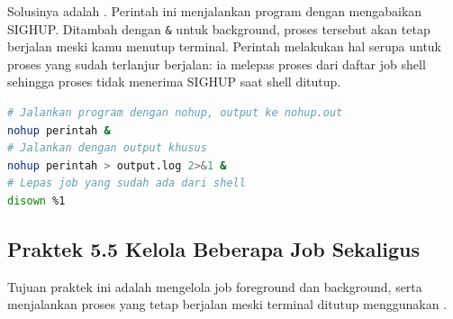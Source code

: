 Solusinya adalah . Perintah ini menjalankan program dengan mengabaikan
SIGHUP. Ditambah dengan \texttt{\&} untuk background, proses tersebut akan tetap berjalan
meski kamu menutup terminal. Perintah  melakukan hal serupa untuk proses yang
sudah terlanjur berjalan: ia melepas proses dari daftar job shell sehingga proses tidak
menerima SIGHUP saat shell ditutup.

\begin{lstlisting}[language=bash, caption={Menjalankan proses tahan logout}]
# Jalankan program dengan nohup, output ke nohup.out
nohup perintah &
# Jalankan dengan output khusus
nohup perintah > output.log 2>&1 &
# Lepas job yang sudah ada dari shell
disown %1
\end{lstlisting}

\subsection*{Praktek 5.5 Kelola Beberapa Job Sekaligus}

Tujuan praktek ini adalah mengelola job foreground dan background, serta menjalankan
proses yang tetap berjalan meski terminal ditutup menggunakan .

